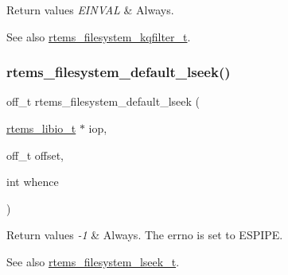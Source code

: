\begin{DoxyRetVals}{Return values}
{\em E\+I\+N\+V\+AL} & Always.\\
\hline
\end{DoxyRetVals}
\begin{DoxySeeAlso}{See also}
\mbox{\hyperlink{group__LibIOFSHandler_ga8d33b578b98ea48ea8f2282632e01e72}{rtems\+\_\+filesystem\+\_\+kqfilter\+\_\+t}}. 
\end{DoxySeeAlso}
\mbox{\label{group__LibIOFSHandler_gabc972cf07584efa949cb5ca635de7f06}} 
\subsubsection{\texorpdfstring{rtems\_filesystem\_default\_lseek()}{rtems\_filesystem\_default\_lseek()}}
{\footnotesize\ttfamily off\+\_\+t rtems\+\_\+filesystem\+\_\+default\+\_\+lseek (\begin{DoxyParamCaption}\item[{\mbox{\hyperlink{structrtems__libio__tt}{rtems\+\_\+libio\+\_\+t}} $\ast$}]{iop,  }\item[{off\+\_\+t}]{offset,  }\item[{int}]{whence }\end{DoxyParamCaption})}


\begin{DoxyRetVals}{Return values}
{\em -\/1} & Always. The errno is set to E\+S\+P\+I\+PE.\\
\hline
\end{DoxyRetVals}
\begin{DoxySeeAlso}{See also}
\mbox{\hyperlink{group__LibIOFSHandler_gab3752ab0473efced7afee0d60c0e2c58}{rtems\+\_\+filesystem\+\_\+lseek\+\_\+t}}. 
\end{DoxySeeAlso}
\mbox{\label{group__LibIOFSHandler_ga2cfb650e15d0a0589079c8c1a5a5c665}} 
